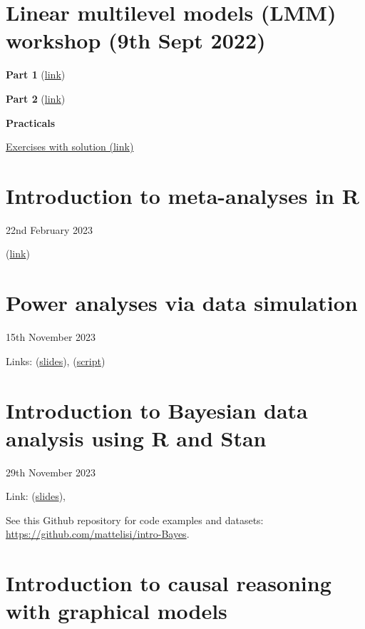 \documentclass[
]{book}
\begin{document}
\section{Linear multilevel models (LMM) workshop (9th Sept 2022)}\label{linear-multilevel-models-lmm-workshop-9th-sept-2022}

\textbf{Part 1} (\href{https://mlisi.xyz/files/workshops/LMM101/LMM_part1.html}{link})

\textbf{Part 2} (\href{https://mlisi.xyz/files/workshops/LMM101/LMM_part2.html}{link})

\textbf{Practicals}

\href{https://mlisi.xyz/files/workshops/LMM101/exercises/exercises_questions.html}{Exercises with solution (link)}

\section{Introduction to meta-analyses in R}\label{introduction-to-meta-analyses-in-r}

22nd February 2023

(\href{https://mlisi.xyz/files/workshops/meta_analyses/meta_analyses_slides.html}{link})

\section{Power analyses via data simulation}\label{power-analyses-via-data-simulation}

15th November 2023

Links: (\href{https://mlisi.xyz/files/workshops/power_analyses/power_analyses.html}{slides}),
(\href{https://mlisi.xyz/files/workshops/power_analyses/power_analysis_workshop_script.R}{script})

\section{Introduction to Bayesian data analysis using R and Stan}\label{introduction-to-bayesian-data-analysis-using-r-and-stan}

29th November 2023

Link: (\href{https://mlisi.xyz/files/workshops/intro_bayes/intro-Bayes.html}{slides}),

See this Github repository for code examples and datasets: \url{https://github.com/mattelisi/intro-Bayes}.

\section{Introduction to causal reasoning with graphical models}\label{introduction-to-causal-reasoning-with-graphical-models}
\end{document}

